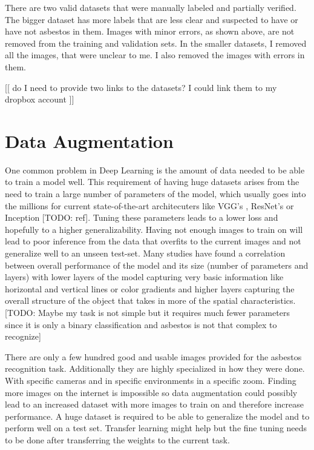 There are two valid datasets that were manually labeled and partially verified. The bigger dataset has more labels that are less clear and suspected to have or have not asbestos in them. Images with minor errors, as shown above, are not removed from the training and validation sets. In the smaller datasets, I removed all the images, that were unclear to me. I also removed the images with errors in them.

[[ do I need to provide two links to the datasets? I could link them to my dropbox account ]]


\section{Data Augmentation}

One common problem in Deep Learning is the amount of data needed to be able to train a model well. This requirement of having huge datasets arises from the need to train a large number of parameters of the model, which usually goes into the millions for current state-of-the-art architecuters like VGG's \cite{simonyan2014very}, ResNet's \cite{he2016deep} or Inception [TODO: ref]. Tuning these parameters leads to a lower loss and hopefully to a higher generalizability. Having not enough images to train on will lead to poor inference from the data that overfits to the current images and not generalize well to an unseen test-set. Many studies have found a correlation between overall performance of the model and its size (number of parameters and layers) with lower layers of the model capturing very basic information like horizontal and vertical lines or color gradients and higher layers capturing the overall structure of the object that takes in more of the spatial characteristics. [TODO: Maybe my task is not simple but it requires much fewer parameters since it is only a binary classification and asbestos is not that complex to recognize]

There are only a few hundred good and usable images provided for the asbestos recognition task. Additionally they are highly specialized in how they were done. With specific cameras and in specific environments in a specific zoom. Finding more images on the internet is impossible so data augmentation could possibly lead to an increased dataset with more images to train on and therefore increase performance. A huge dataset is required to be able to generalize the model and to perform well on a test set. Transfer learning might help but the fine tuning needs to be done after transferring the weights to the current task.

